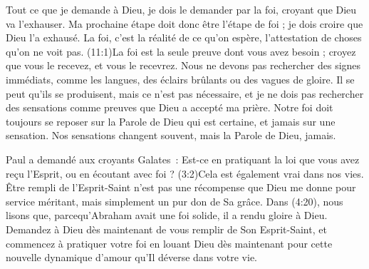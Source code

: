 Tout ce que je demande à Dieu, je dois le demander par la foi,
 croyant que Dieu va l'exhauser. Ma prochaine étape doit donc être
 l'étape de foi ; je dois croire que Dieu l'a exhausé.
 La foi, c'est la réalité de ce qu'on espère,
 l'attestation de choses qu'on ne voit pas.
 (11:1)La foi est la seule preuve dont vous avez besoin ;
 croyez que vous le recevez, et vous le recevrez.
 Nous ne devons pas rechercher des signes immédiats, comme les langues,
 des éclairs brûlants ou des vagues de gloire.
 Il se peut qu'ils se produisent, mais ce n'est pas nécessaire,
 et je ne dois pas rechercher des sensations comme preuves
 que Dieu a accepté ma prière. Notre foi doit toujours se reposer
 sur la Parole de Dieu qui est certaine, et jamais sur une sensation.
 Nos sensations changent souvent, mais la Parole de Dieu, jamais.

Paul a demandé aux croyants Galates~:
 \og Est-ce en pratiquant la loi que vous avez reçu l'Esprit,
 ou en écoutant avec foi ? \fg{}
 (3:2)Cela est également vrai dans nos vies.
 Être rempli de l'Esprit-Saint n'est pas une récompense que Dieu
 me donne pour service méritant, mais simplement un pur don de Sa grâce.
 Dans (4:20), nous lisons que, parcequ'Abraham avait
 une foi solide, il a rendu gloire à Dieu.
 Demandez à Dieu dès maintenant de vous remplir de Son Esprit-Saint,
 et commencez à pratiquer votre foi en louant Dieu dès maintenant
 pour cette nouvelle dynamique d'amour qu'Il déverse dans votre vie.
\closechapter

